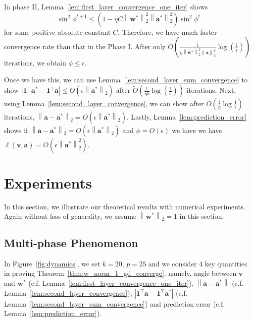 \documentclass{article}
\newcommand{\firstlayer}{w}
\newcommand{\firstlayerWN}{v}
\newcommand{\secondlayer}{a}
\newcommand{\vect}[1]{\mathbf{#1}}
\newcommand{\norm}[1]{\left\|#1\right\|}
\newcommand{\abs}[1]{\left|#1\right|}
\begin{document}
In phase II, Lemma~\ref{lem:first_layer_convergence_one_iter} shows \[
\sin^2\phi^{t+1} \le \left(1-\eta C \norm{\vect{\firstlayer}^*}_2^2\norm{\vect{\secondlayer}^*}_2^2\right)\sin^2\phi^t
\] for some positive absolute constant $C$.
Therefore, we have much faster convergence rate than that in the Phase I.
After only $\widetilde{O}\left(\frac{1}{\eta \norm{\vect{\firstlayer}^*}_2^2\norm{\vect{\secondlayer}}_2^2}\log\left(\frac{1}{\epsilon}\right)\right)$ iterations, we obtain $\phi \le \epsilon$.

Once we have this, we can use  Lemma~\ref{lem:second_layer_sum_convergence} to show $\abs{\vect{1}^\top \vect{\secondlayer}^*-\vect{1}^\top \vect{\secondlayer}} \le O\left(\epsilon \norm{\vect{\secondlayer}^*}_2\right)$ after $\widetilde{O}(\frac{1}{\eta k}\log\left(\frac{1}{\epsilon}\right))$ iterations.
Next, using Lemma~\ref{lem:second_layer_convergence}, we can show after $\widetilde{O}\left(\frac{1}{\eta}\log\frac{1}{\epsilon}\right)$ iterations, $\norm{\vect{\secondlayer}-\vect{\secondlayer}^*}_2 = O\left(\epsilon\norm{\vect{\secondlayer}^*}_2\right)$.
Lastly,
Lemma~\ref{lem:prediction_error} shows if $\norm{\vect{\secondlayer}-\vect{\secondlayer}^*}_2 = O\left(\epsilon\norm{\vect{\secondlayer}^*}_2\right)$ and $\phi= O\left( \epsilon\right)$ we have we have $\ell\left(\vect{\firstlayerWN},\vect{\secondlayer}\right) = O\left(\epsilon \norm{\vect{\secondlayer}^*}_2^2\right)$.



\section{Experiments}
\label{sec:exp}
In this section, we illustrate our theoretical results with numerical experiments.
Again without loss of generality, we assume $\norm{\vect{\firstlayer}^*}_2=1$ in this section.

\subsection{Multi-phase Phenomenon}
In Figure~\ref{fig:dynamics}, we set $k=20$, $p=25$ and we consider 4 key quantities in proving Theorem~\ref{thm:w_norm_1_gd_converge}, namely, angle between $\vect{\firstlayerWN}$ and $\vect{\firstlayer}^*$ (c.f. Lemma~\ref{lem:first_layer_convergence_one_iter}), $\norm{\vect{\secondlayer}-\vect{\secondlayer}^*}$ (c.f. Lemma~\ref{lem:second_layer_convergence}), $\abs{\vect{1}^\top \vect{\secondlayer}-\vect{1}^\top \vect{\secondlayer}^*}$ (c.f. Lemma~\ref{lem:second_layer_sum_convergence}) and prediction error (c.f. Lemma~\ref{lem:prediction_error}).
\end{document}

